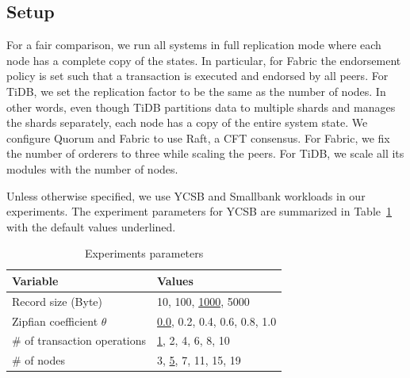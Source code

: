 
\subsection{Setup}
For a fair comparison, we run all systems in full replication mode where each
node has a complete copy of the states. In particular, for Fabric the
endorsement policy is set such that a transaction is executed and endorsed by
all peers. For TiDB, we set the replication factor to be the same as the number
of nodes. In other words, even though TiDB partitions data to multiple
shards and manages the shards separately, each node has a copy of the entire
system state. We configure Quorum and Fabric to use Raft, a CFT consensus.
For Fabric, we fix the number of orderers to three while scaling the peers.
For TiDB, we scale all its modules with the number of nodes.

Unless otherwise specified, we use YCSB and Smallbank workloads in our
experiments. The experiment parameters for YCSB are summarized in
Table~\ref{tab:twin:parameter} with the default values underlined.

\begin{table}
	\centering
	\caption{Experiments parameters}
	\label{tab:twin:parameter}
	\begin{tabular}{@{}ll@{}}
	\toprule
	\textbf{Variable}               & \textbf{Values}               \\
	\midrule
	Record size (Byte)               & 10, 100, \underline{1000}, 5000          \\
	Zipfian coefficient $\theta$       & \underline{0.0}, 0.2, 0.4, 0.6, 0.8, 1.0 \\
	\# of transaction operations & \underline{1}, 2, 4, 6, 8, 10            \\
	\# of nodes & 3, \underline{5}, 7, 11, 15, 19            \\
	\bottomrule
	\end{tabular}
\end{table}

